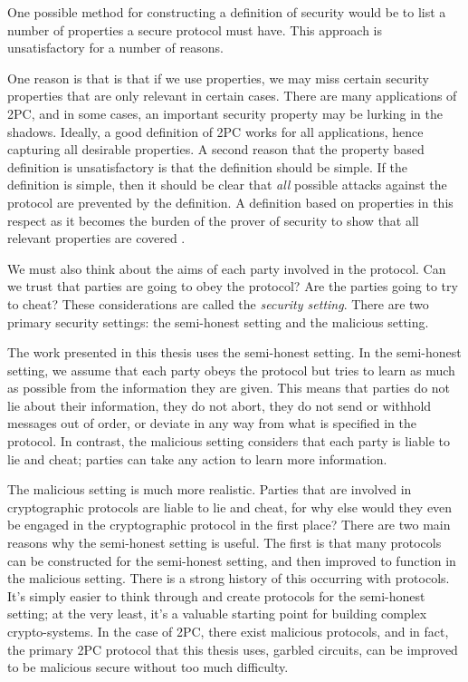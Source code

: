 One possible method for constructing a definition of security would be to list a number of properties a secure protocol must have.
This approach is unsatisfactory for a number of reasons.

One reason is that is that if we use properties, we may miss certain security properties that are only relevant in certain cases. 
There are many applications of 2PC, and in some cases, an important security property may be lurking in the shadows. 
Ideally, a good definition of 2PC works for all applications, hence capturing all desirable properties.
A second reason that the property based definition is unsatisfactory is that the definition should be simple.
If the definition is simple, then it should be clear that \textit{all} possible attacks against the protocol are prevented by the definition.
A definition based on properties in this respect as it becomes the burden of the prover of security to show that all relevant properties are covered \cite{lindell2009}.

We must also think about the aims of each party involved in the protocol. 
Can we trust that parties are going to obey the protocol? 
Are the parties going to try to cheat?
These considerations are called the \textit{security setting}.
There are two primary security settings: the semi-honest setting and the malicious setting. 

The work presented in this thesis uses the semi-honest setting. 
In the semi-honest setting, we assume that each party obeys the protocol but tries to learn as much as possible from the information they are given.
This means that parties do not lie about their information, they do not abort, they do not send or withhold messages out of order, or deviate in any way from what is specified in the protocol. 
In contrast, the malicious setting considers that each party is liable to lie and cheat; parties can take any action to learn more information.

The malicious setting is much more realistic. 
Parties that are involved in cryptographic protocols are liable to lie and cheat, for why else would they even be engaged in the cryptographic protocol in the first place?
There are two main reasons why the semi-honest setting is useful.
The first is that many protocols can be constructed for the semi-honest setting, and then improved to function in the malicious setting.
There is a strong history of this occurring with protocols.
It's simply easier to think through and create protocols for the semi-honest setting; at the very least, it's a valuable starting point for building complex crypto-systems.
In the case of 2PC, there exist malicious protocols, and in fact, the primary 2PC protocol that this thesis uses, garbled circuits, can be improved to be malicious secure without too much difficulty. 

